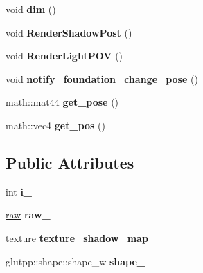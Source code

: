 \begin{DoxyCompactItemize}
\item 
\hypertarget{classglutpp_1_1light_1_1light_a268f34b24b62e9bc6947ffcfd991ef50}{void {\bfseries dim} ()}\label{classglutpp_1_1light_1_1light_a268f34b24b62e9bc6947ffcfd991ef50}

\item 
\hypertarget{classglutpp_1_1light_1_1light_ae6cb64d97584ae3f122fed38a7ec1220}{void {\bfseries \-Render\-Shadow\-Post} ()}\label{classglutpp_1_1light_1_1light_ae6cb64d97584ae3f122fed38a7ec1220}

\item 
\hypertarget{classglutpp_1_1light_1_1light_acf001e6ef0610163c79d487304d10d42}{void {\bfseries \-Render\-Light\-P\-O\-V} ()}\label{classglutpp_1_1light_1_1light_acf001e6ef0610163c79d487304d10d42}

\item 
\hypertarget{classglutpp_1_1light_1_1light_a08584b01145fe402d6441b702577b6cc}{void {\bfseries notify\-\_\-foundation\-\_\-change\-\_\-pose} ()}\label{classglutpp_1_1light_1_1light_a08584b01145fe402d6441b702577b6cc}

\item 
\hypertarget{classglutpp_1_1light_1_1light_afbc597b8febb2066adebcd96cc900640}{math\-::mat44 {\bfseries get\-\_\-pose} ()}\label{classglutpp_1_1light_1_1light_afbc597b8febb2066adebcd96cc900640}

\item 
\hypertarget{classglutpp_1_1light_1_1light_adeaf05be2b4aeda48f61366f6fbaa489}{math\-::vec4 {\bfseries get\-\_\-pos} ()}\label{classglutpp_1_1light_1_1light_adeaf05be2b4aeda48f61366f6fbaa489}

\end{DoxyCompactItemize}
\subsection*{\-Public \-Attributes}
\begin{DoxyCompactItemize}
\item 
\hypertarget{classglutpp_1_1light_1_1light_afa7e0890ce66350d6adad22282ec4a19}{int {\bfseries i\-\_\-}}\label{classglutpp_1_1light_1_1light_afa7e0890ce66350d6adad22282ec4a19}

\item 
\hypertarget{classglutpp_1_1light_1_1light_ac919169305f5dc46e47073308b1d26e1}{\hyperlink{classglutpp_1_1light_1_1raw}{raw} {\bfseries raw\-\_\-}}\label{classglutpp_1_1light_1_1light_ac919169305f5dc46e47073308b1d26e1}

\item 
\hypertarget{classglutpp_1_1light_1_1light_a514b6b13118418366398118bb47291be}{\hyperlink{classglutpp_1_1texture}{texture} {\bfseries texture\-\_\-shadow\-\_\-map\-\_\-}}\label{classglutpp_1_1light_1_1light_a514b6b13118418366398118bb47291be}

\item 
\hypertarget{classglutpp_1_1light_1_1light_abc14ce2d7a706c4c77bf52c9f66692ca}{glutpp\-::shape\-::shape\-\_\-w {\bfseries shape\-\_\-}}\label{classglutpp_1_1light_1_1light_abc14ce2d7a706c4c77bf52c9f66692ca}

\end{DoxyCompactItemize}


